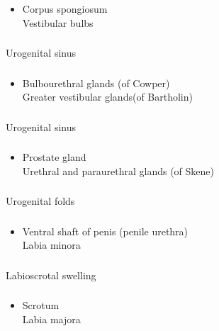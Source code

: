 \documentclass[11pt]{beamer}
\begin{document}
\begin{frame}
 \frametitle{}
\begin{itemize}
\item{Corpus spongiosum \\ Vestibular bulbs}
\end{itemize}
\end{frame}

\begin{frame}
 \frametitle{}
Urogenital sinus
\end{frame}

\begin{frame}
 \frametitle{}
\begin{itemize}
\item{Bulbourethral glands (of Cowper) \\ Greater vestibular glands(of Bartholin)}
\end{itemize}
\end{frame}

\begin{frame}
 \frametitle{}
Urogenital sinus
\end{frame}

\begin{frame}
 \frametitle{}
\begin{itemize}
\item{Prostate gland \\ Urethral and paraurethral glands (of Skene)}
\end{itemize}
\end{frame}

\begin{frame}
 \frametitle{}
Urogenital folds
\end{frame}

\begin{frame}
 \frametitle{}
\begin{itemize}
\item{Ventral shaft of penis (penile urethra) \\ Labia minora}
\end{itemize}
\end{frame}

\begin{frame}
 \frametitle{}
Labioscrotal swelling
\end{frame}

\begin{frame}
 \frametitle{}
\begin{itemize}
\item{Scrotum \\ Labia majora}
\end{itemize}
\end{frame}
\end{document}
